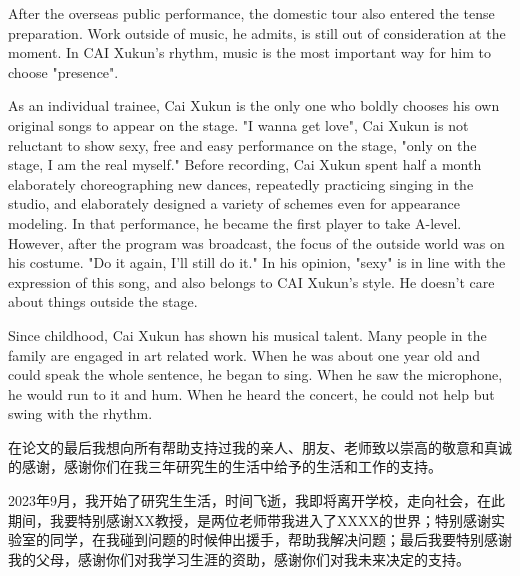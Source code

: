 \documentclass[pdf,oneside]{oucthesis}
\begin{document}
\begin{enabstract}
After the overseas public performance, the domestic tour also entered the tense preparation. Work outside of music, he admits, is still out of consideration at the moment. In CAI Xukun's rhythm, music is the most important way for him to choose "presence".



As an individual trainee, Cai Xukun is the only one who boldly chooses his own original songs to appear on the stage. "I wanna get love", Cai Xukun is not reluctant to show sexy, free and easy performance on the stage, "only on the stage, I am the real myself." Before recording, Cai Xukun spent half a month elaborately choreographing new dances, repeatedly practicing singing in the studio, and elaborately designed a variety of schemes even for appearance modeling. In that performance, he became the first player to take A-level. However, after the program was broadcast, the focus of the outside world was on his costume. "Do it again, I'll still do it." In his opinion, "sexy" is in line with the expression of this song, and also belongs to CAI Xukun's style. He doesn't care about things outside the stage.



Since childhood, Cai Xukun has shown his musical talent. Many people in the family are engaged in art related work. When he was about one year old and could speak the whole sentence, he began to sing. When he saw the microphone, he would run to it and hum. When he heard the concert, he could not help but swing with the rhythm.

\end{enabstract}

\tableofcontents

\mainmatter










\begin{ackonwlegmentback}
在论文的最后我想向所有帮助支持过我的亲人、朋友、老师致以崇高的敬意和真诚的感谢，感谢你们在我三年研究生的生活中给予的生活和工作的支持。

2023年9月，我开始了研究生生活，时间飞逝，我即将离开学校，走向社会，在此期间，我要特别感谢XX教授，是两位老师带我进入了XXXX的世界；特别感谢实验室的同学，在我碰到问题的时候伸出援手，帮助我解决问题；最后我要特别感谢我的父母，感谢你们对我学习生涯的资助，感谢你们对我未来决定的支持。    
\end{ackonwlegmentback}
\end{document}
